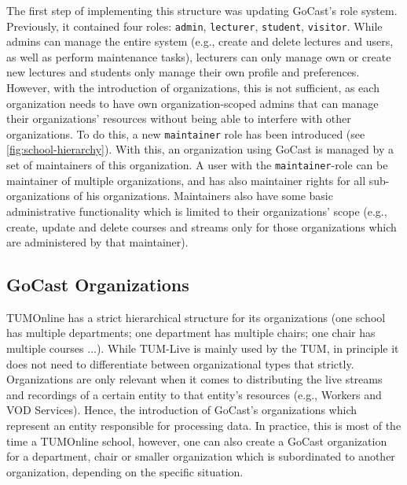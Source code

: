 The first step of implementing this structure was updating GoCast's role system. Previously, it contained four roles: \texttt{admin}, \texttt{lecturer}, \texttt{student}, \texttt{visitor}. While admins can manage the entire system (e.g., create and delete lectures and users, as well as perform maintenance tasks), lecturers can only manage own or create new lectures and students only manage their own profile and preferences. However, with the introduction of organizations, this is not sufficient, as each organization needs to have own organization-scoped admins that can manage their organizations' resources without being able to interfere with other organizations. To do this, a new \texttt{maintainer} role has been introduced (see \autoref{fig:school-hierarchy}).
With this, an organization using GoCast is managed by a set of maintainers of this organization. A user with the \texttt{maintainer}-role can be maintainer of multiple organizations, and has also maintainer rights for all sub-organizations of his organizations.  
Maintainers also have some basic administrative functionality which is limited to their organizations' scope (e.g., create, update and delete courses and streams only for those organizations which are administered by that maintainer). 

\subsection{GoCast Organizations}

TUMOnline has a strict hierarchical structure for its organizations (one school has multiple departments; one department has multiple chairs; one chair has multiple courses ...).
%
While TUM-Live is mainly used by the TUM, in principle it does not need to differentiate between organizational types that strictly. Organizations are only relevant when it comes to distributing the live streams and recordings of a certain entity to that entity's resources (e.g., Workers and VOD Services). Hence, the introduction of GoCast's organizations which represent an entity responsible for processing data. In practice, this is most of the time a TUMOnline school, however, one can also create a GoCast organization for a department, chair or smaller organization which is subordinated to another organization, depending on the specific situation.

